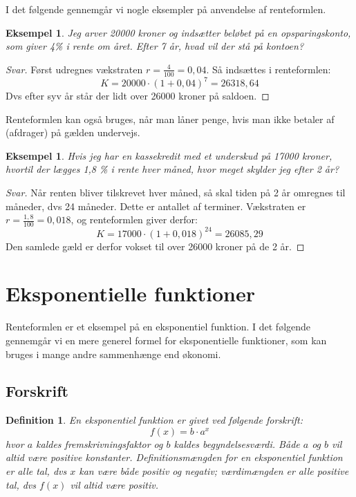 \documentclass[12pt,oneside,a4paper]{article}
\newtheorem{mydef}[thm]{Definition}
\newtheorem{eks}[thm]{Eksempel}
\begin{document}
I det følgende gennemgår vi nogle eksempler på anvendelse af renteformlen.
\begin{eks}
    Jeg arver 20000 kroner og indsætter beløbet på en opsparingskonto, som
    giver 4\% i rente om året. Efter 7 år, hvad vil der stå på kontoen?
\end{eks}
\begin{proof}[Svar]
    Først udregnes vækstraten $r=\frac{4}{100} = 0,04$. Så indsættes i renteformlen:
    $$
    K = 20000 \cdot (1 + 0,04)^7 = 26318,64
    $$
    Dvs efter syv år står der lidt over 26000 kroner på saldoen.
\end{proof}

Renteformlen kan også bruges, når man låner penge, hvis man ikke betaler af
(afdrager) på gælden undervejs.
\begin{eks}
    Hvis jeg har en kassekredit med et underskud på 17000 kroner, hvortil der
    lægges 1,8 \% i rente hver måned, hvor meget skylder jeg efter 2 år?
\end{eks}
\begin{proof}[Svar]
    Når renten bliver tilskrevet hver måned, så skal tiden på 2 år omregnes til
    måneder, dvs 24 måneder. Dette er antallet af terminer. Vækstraten er $r =
    \frac{1,8}{100} = 0,018$, og renteformlen giver derfor:
    $$
    K = 17000 \cdot (1 + 0,018)^{24} = 26085,29
    $$
    Den samlede gæld er derfor vokset til over 26000 kroner på de 2 år.
\end{proof}

\section{Eksponentielle funktioner}
Renteformlen er et eksempel på en eksponentiel funktion. I det følgende
gennemgår vi en mere generel formel for eksponentielle funktioner, som kan
bruges i mange andre sammenhænge end økonomi.

\subsection{Forskrift}
\begin{mydef}
    En eksponentiel funktion er givet ved følgende forskrift:
    $$
    f(x) = b\cdot a^x
    $$
    hvor $a$ kaldes {\em fremskrivningsfaktor} og $b$ kaldes {\em
    begyndelsesværdi}. Både $a$ og $b$ vil altid være positive konstanter.
    Definitionsmængden for en eksponentiel funktion er alle tal, dvs $x$ kan
    være både positiv og negativ; værdimængden er alle positive tal, dvs
    $f(x)$ vil altid være positiv.
\end{mydef}
\end{document}
